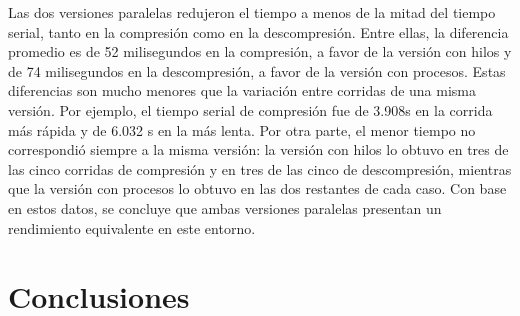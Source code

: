 \documentclass{report}
\begin{document}
Las dos versiones paralelas redujeron el tiempo a menos de la mitad del tiempo serial, tanto en la compresión como en la descompresión. Entre ellas, la diferencia promedio es de 52 milisegundos en la compresión, a favor de la versión con hilos y de 74 milisegundos en la descompresión, a favor de la versión con procesos. Estas diferencias son mucho menores que la variación entre corridas de una misma versión. Por ejemplo, el tiempo serial de compresión fue de 3.908s en la corrida más rápida y de 6.032 s en la más lenta. Por otra parte, el menor tiempo no correspondió siempre a la misma versión: la versión con hilos lo obtuvo en tres de las cinco corridas de compresión y en tres de las cinco de descompresión, mientras que la versión con procesos lo obtuvo en las dos restantes de cada caso. Con base en estos datos, se concluye que ambas versiones paralelas presentan un rendimiento equivalente en este entorno.

\chapter{Conclusiones}\label{conclusiones}
\end{document}
